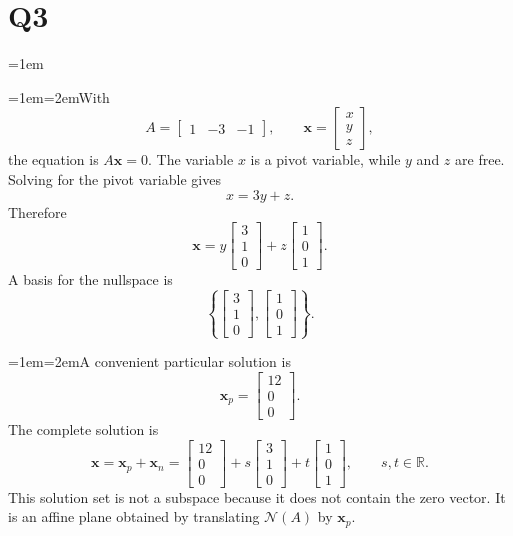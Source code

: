\documentclass[11pt]{article}
\newcommand{\solutionquestion}[1]{\par\leftskip=0pt\section*{Q#1}\leftskip=1em}
\newcommand{\solutionpart}[1]{\par\smallskip\leftskip=1em\noindent\hangindent=2em\hangafter=1\makebox[1.5em][l]{\textbf{(#1)}}\hspace{0.5em}\ignorespaces}
\begin{document}
\solutionquestion{3}
\solutionpart{i}With
\[
A=\begin{bmatrix}1&-3&-1\end{bmatrix},
\qquad
\mathbf{x}=\begin{bmatrix}x\\y\\z\end{bmatrix},
\]
the equation is $A\mathbf{x}=0$. The variable $x$ is a pivot variable, while $y$ and $z$ are free. Solving for the pivot variable gives
\[
x=3y+z.
\]
Therefore
\[
\mathbf{x}
=y\begin{bmatrix}3\\1\\0\end{bmatrix}
+z\begin{bmatrix}1\\0\\1\end{bmatrix}.
\]
A basis for the nullspace is
\[
\left\{
\begin{bmatrix}3\\1\\0\end{bmatrix},
\begin{bmatrix}1\\0\\1\end{bmatrix}
\right\}.
\]

\solutionpart{ii}A convenient particular solution is
\[
\mathbf{x}_p=\begin{bmatrix}12\\0\\0\end{bmatrix}.
\]
The complete solution is
\[
\mathbf{x}
=\mathbf{x}_p+\mathbf{x}_n
=\begin{bmatrix}12\\0\\0\end{bmatrix}
+s\begin{bmatrix}3\\1\\0\end{bmatrix}
+t\begin{bmatrix}1\\0\\1\end{bmatrix},
\qquad s,t\in\mathbb R.
\]
This solution set is not a subspace because it does not contain the zero vector. It is an affine plane obtained by translating $\mathcal N(A)$ by $\mathbf{x}_p$.
\end{document}
